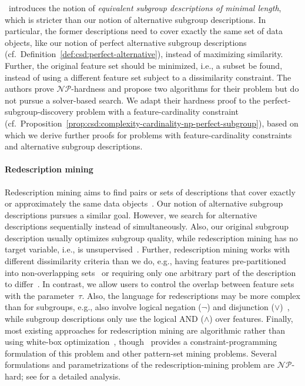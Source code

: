 \documentclass{article}
\theoremstyle{definition}
\begin{document}
\cite{boley2009non}~introduces the notion of \emph{equivalent subgroup descriptions of minimal length}, which is stricter than our notion of alternative subgroup descriptions.
In particular, the former descriptions need to cover exactly the same set of data objects, like our notion of perfect alternative subgroup descriptions (cf.~Definition~\ref{def:csd:perfect-alternative}), instead of maximizing similarity.
Further, the original feature set should be minimized, i.e., a subset be found, instead of using a different feature set subject to a dissimilarity constraint.
The authors prove $\mathcal{NP}$-hardness and propose two algorithms for their problem but do not pursue a solver-based search.
We adapt their hardness proof to the perfect-subgroup-discovery problem with a feature-cardinality constraint (cf.~Proposition~\ref{prop:csd:complexity-cardinality-np-perfect-subgroup}), based on which we derive further proofs for problems with feature-cardinality constraints and alternative subgroup descriptions.

\paragraph{Redescription mining}

Redescription mining aims to find pairs or sets of descriptions that cover exactly or approximately the same data objects~\cite{galbrun2017redescription, ramakrishnan2004turning}.
Our notion of alternative subgroup descriptions pursues a similar goal.
However, we search for alternative descriptions sequentially instead of simultaneously.
Also, our original subgroup description usually optimizes subgroup quality, while redescription mining has no target variable, i.e., is unsupervised~\cite{ramakrishnan2004turning}.
Further, redescription mining works with different dissimilarity criteria than we do, e.g., having features pre-partitioned into non-overlapping sets~\cite{galbrun2017redescription, gallo2008finding, mihelcic2023complexity} or requiring only one arbitrary part of the description to differ~\cite{parida2005redescription}.
In contrast, we allow users to control the overlap between feature sets with the parameter~$\tau$.
Also, the language for redescriptions may be more complex than for subgroups, e.g., also involve logical negation ($\lnot$) and disjunction ($\lor$)~\cite{galbrun2017redescription, gallo2008finding}, while subgroup descriptions only use the logical AND ($\land$) over features.
Finally, most existing approaches for redescription mining are algorithmic rather than using white-box optimization~\cite{galbrun2017redescription, mihelcic2023complexity}, though~\cite{guns2013kpattern} provides a constraint-programming formulation of this problem and other pattern-set mining problems.
Several formulations and parametrizations of the redescription-mining problem are $\mathcal{NP}$-hard; see \cite{mihelcic2023complexity} for a detailed analysis.
\end{document}
